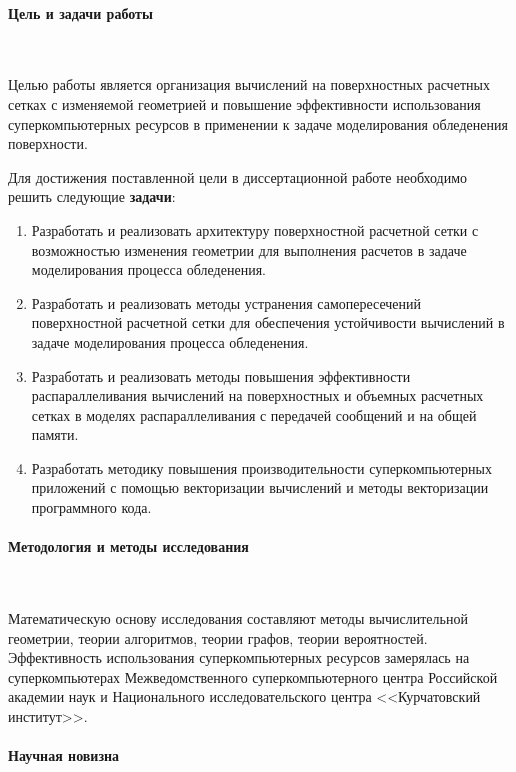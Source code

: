 \documentclass[a4paper,14pt]{extarticle}                     %
\theoremstyle{plain}                                         %
\begin{document}
\paragraph{Цель и задачи работы}

\

Целью работы является организация вычислений на поверхностных расчетных сетках с изменяемой геометрией и повышение эффективности использования суперкомпьютерных ресурсов в применении к задаче моделирования обледенения поверхности.

Для достижения поставленной цели в диссертационной работе необходимо решить следующие \textbf{задачи}:
\begin{enumerate}[noitemsep,topsep=0pt,parsep=0pt,partopsep=0pt]
\item Разработать и реализовать архитектуру поверхностной расчетной сетки с возможностью изменения геометрии для выполнения расчетов в задаче моделирования процесса обледенения.
\item Разработать и реализовать методы устранения самопересечений поверхностной расчетной сетки для обеспечения устойчивости вычислений в задаче моделирования процесса обледенения.
\item Разработать и реализовать методы повышения эффективности распараллеливания вычислений на поверхностных и объемных расчетных сетках в моделях распараллеливания с передачей сообщений и на общей памяти.
\item Разработать методику повышения производительности суперкомпьютерных приложений с помощью векторизации вычислений и методы векторизации программного кода.
\end{enumerate}

\paragraph{Методология и методы исследования}

\

Математическую основу исследования составляют методы вычислительной геометрии, теории алгоритмов, теории графов, теории вероятностей.
Эффективность использования суперкомпьютерных ресурсов замерялась на суперкомпьютерах Межведомственного суперкомпьютерного центра Российской академии наук и Национального исследовательского центра <<Курчатовский институт>>.

\paragraph{Научная новизна}
\end{document}
